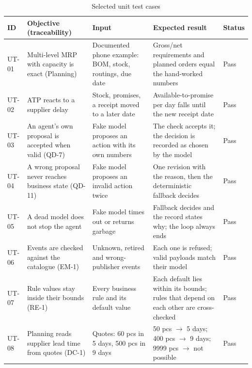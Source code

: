 \begin{table}[h]
\centering
\small
\renewcommand{\arraystretch}{1.2}
\begin{tabular}{|p{}|p{}|p{}|p{}|p{}|}
\hline
\textbf{ID} & \textbf{Objective (traceability)} & \textbf{Input} & \textbf{Expected result} & \textbf{Status} \\ \hline
UT-01 & Multi-level MRP with capacity is exact (Planning) & Documented phone example: BOM, stock, routings, due date
      & Gross/net requirements and planned orders equal the hand-worked numbers & Pass \\ \hline
UT-02 & ATP reacts to a supplier delay & Stock, promises, a receipt moved to a later date
      & Available-to-promise per day falls until the new receipt date & Pass \\ \hline
UT-03 & An agent's own proposal is accepted when valid (QD-7) & Fake model proposes an action with its own numbers
      & The check accepts it; the decision is recorded as chosen by the model & Pass \\ \hline
UT-04 & A wrong proposal never reaches business state (QD-11) & Fake model proposes an invalid action twice
      & One revision with the reason, then the deterministic fallback decides & Pass \\ \hline
UT-05 & A dead model does not stop the agent & Fake model times out or returns garbage
      & Fallback decides and the record states why; the loop always ends & Pass \\ \hline
UT-06 & Events are checked against the catalogue (EM-1) & Unknown, retired and wrong-publisher events
      & Each one is refused; valid payloads match their model & Pass \\ \hline
UT-07 & Rule values stay inside their bounds (RE-1) & Every business rule and its default value
      & Each default lies within its bounds; rules that depend on each other are cross-checked & Pass \\ \hline
UT-08 & Planning reads supplier lead time from quotes (DC-1) & Quotes: 60 pcs in 5 days, 500 pcs in 9 days
      & 50 pcs $\rightarrow$ 5 days; 400 pcs $\rightarrow$ 9 days; 9999 pcs $\rightarrow$ not possible & Pass \\ \hline
\end{tabular}
\caption{Selected unit test cases}
\label{tab:unit-cases}
\end{table}

